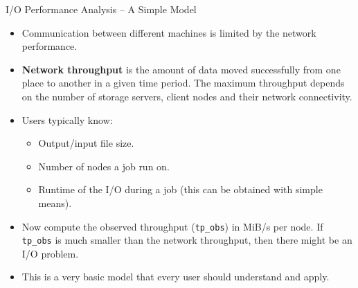 \documentclass[compress,11pt,xcolor=svgnames,aspectratio=169]{beamer}
\begin{document}
\begin{frame}[fragile]{I/O Performance Analysis -- A Simple Model}

\begin{itemize}
\setlength\itemsep{0.3cm}

  \item Communication between different machines is limited by the network performance.

  \item \textbf{Network throughput} is the amount of data moved successfully from one place to another in a given time period. The maximum throughput depends on the number of storage servers, client nodes and their network connectivity.

  \item Users typically know:

    \begin{itemize}
      \item Output/input file size.
      \item Number of nodes a job run on.
      \item Runtime of the I/O during a job (this can be obtained with simple means).
    \end{itemize}

  \item Now compute the observed throughput (\verb|tp_obs|) in MiB/s per node. If \verb|tp_obs| is much smaller than the network throughput, then there might be an I/O problem.

  \item This is a very basic model that every user should understand and apply.

\end{itemize}

\end{frame}
\end{document}
